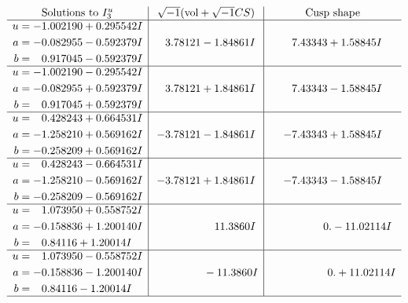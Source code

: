 \documentclass[1p]{elsarticle_modified}
\theoremstyle{definition}
\newcommand{\I}{\sqrt{-1}}
\begin{document}
$$\begin{array}{c|c|c}  
\text{Solutions to }I^u_{3}& \I (\text{vol} + \sqrt{-1}CS) & \text{Cusp shape}\\
 \hline 
\begin{aligned}
u &= -1.002190 + 0.295542 I \\
a &= -0.082955 - 0.592379 I \\
b &= \phantom{-}0.917045 - 0.592379 I\end{aligned}
 & \phantom{-}3.78121 - 1.84861 I & \phantom{-}7.43343 + 1.58845 I \\ \hline\begin{aligned}
u &= -1.002190 - 0.295542 I \\
a &= -0.082955 + 0.592379 I \\
b &= \phantom{-}0.917045 + 0.592379 I\end{aligned}
 & \phantom{-}3.78121 + 1.84861 I & \phantom{-}7.43343 - 1.58845 I \\ \hline\begin{aligned}
u &= \phantom{-}0.428243 + 0.664531 I \\
a &= -1.258210 + 0.569162 I \\
b &= -0.258209 + 0.569162 I\end{aligned}
 & -3.78121 - 1.84861 I & -7.43343 + 1.58845 I \\ \hline\begin{aligned}
u &= \phantom{-}0.428243 - 0.664531 I \\
a &= -1.258210 - 0.569162 I \\
b &= -0.258209 - 0.569162 I\end{aligned}
 & -3.78121 + 1.84861 I & -7.43343 - 1.58845 I \\ \hline\begin{aligned}
u &= \phantom{-}1.073950 + 0.558752 I \\
a &= -0.158836 + 1.200140 I \\
b &= \phantom{-}0.84116 + 1.20014 I\end{aligned}
 & \phantom{-0.000000 -}11.3860 I & \phantom{-0.000000 } 0. - 11.02114 I \\ \hline\begin{aligned}
u &= \phantom{-}1.073950 - 0.558752 I \\
a &= -0.158836 - 1.200140 I \\
b &= \phantom{-}0.84116 - 1.20014 I\end{aligned}
 & \phantom{-0.000000 } -11.3860 I & \phantom{-0.000000 -}0. + 11.02114 I\\
 \hline 
 \end{array}$$\newpage\newpage\renewcommand{\arraystretch}{1}
\end{document}
